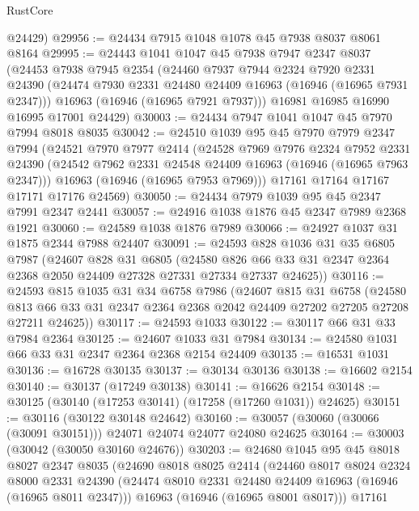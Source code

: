 \begin{lexlean}{RustCore}
\begin{coremodule}
      @24429)
@29956 := @24434 @7915 @1048 @1078 @45 @7938 @8037 @8061 @8164
@29995 := @24443
    @1041
    @1047
    @45
    @7938
    @7947
    @2347
    @8037
    (@24453
      @7938
      @7945
      @2354
      (@24460
        @7937
        @7944
        @2324
        @7920
        @2331
        @24390
        (@24474 @7930 @2331 @24480 @24409 @16963 (@16946 (@16965 @7931 @2347)))
        @16963
        (@16946 (@16965 @7921 @7937)))
      @16981
      @16985
      @16990
      @16995
      @17001
      @24429)
@30003 := @24434 @7947 @1041 @1047 @45 @7970 @7994 @8018 @8035
@30042 := @24510
    @1039
    @95
    @45
    @7970
    @7979
    @2347
    @7994
    (@24521
      @7970
      @7977
      @2414
      (@24528
        @7969
        @7976
        @2324
        @7952
        @2331
        @24390
        (@24542 @7962 @2331 @24548 @24409 @16963 (@16946 (@16965 @7963 @2347)))
        @16963
        (@16946 (@16965 @7953 @7969)))
      @17161
      @17164
      @17167
      @17171
      @17176
      @24569)
@30050 := @24434 @7979 @1039 @95 @45 @2347 @7991 @2347 @2441
@30057 := @24916 @1038 @1876 @45 @2347 @7989 @2368 @1921
@30060 := @24589 @1038 @1876 @7989
@30066 := @24927 @1037 @31 @1875 @2344 @7988 @24407
@30091 := @24593
    @828
    @1036
    @31
    @35
    @6805
    @7987
    (@24607
      @828
      @31
      @6805
      (@24580 @826 @66 @33 @31 @2347 @2364 @2368 @2050 @24409 @27328 @27331 @27334 @27337 @24625))
@30116 := @24593
    @815
    @1035
    @31
    @34
    @6758
    @7986
    (@24607
      @815
      @31
      @6758
      (@24580 @813 @66 @33 @31 @2347 @2364 @2368 @2042 @24409 @27202 @27205 @27208 @27211 @24625))
@30117 := @24593 @1033
@30122 := @30117 @66 @31 @33 @7984 @2364
@30125 := @24607 @1033 @31 @7984
@30134 := @24580 @1031 @66 @33 @31 @2347 @2364 @2368 @2154 @24409
@30135 := @16531 @1031
@30136 := @16728 @30135
@30137 := @30134 @30136
@30138 := @16602 @2154
@30140 := @30137 (@17249 @30138)
@30141 := @16626 @2154
@30148 := @30125 (@30140 (@17253 @30141) (@17258 (@17260 @1031)) @24625)
@30151 := @30116 (@30122 @30148 @24642)
@30160 := @30057 (@30060 (@30066 (@30091 @30151))) @24071 @24074 @24077 @24080 @24625
@30164 := @30003 (@30042 (@30050 @30160 @24676))
@30203 := @24680
    @1045
    @95
    @45
    @8018
    @8027
    @2347
    @8035
    (@24690
      @8018
      @8025
      @2414
      (@24460
        @8017
        @8024
        @2324
        @8000
        @2331
        @24390
        (@24474 @8010 @2331 @24480 @24409 @16963 (@16946 (@16965 @8011 @2347)))
        @16963
        (@16946 (@16965 @8001 @8017)))
      @17161

\end{coremodule}
\end{lexlean}
